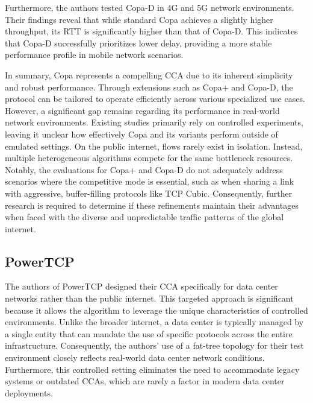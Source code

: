 \documentclass[conference]{IEEEtran}
\begin{document}
Furthermore, the authors tested Copa-D in 4G and 5G network environments. 
Their findings reveal that while standard Copa achieves a slightly higher throughput, its RTT is significantly higher than that of Copa-D. 
This indicates that Copa-D successfully prioritizes lower delay, providing a more stable performance profile in mobile network scenarios.

In summary, Copa represents a compelling \acs{CCA} due to its inherent simplicity and robust performance. 
Through extensions such as Copa+ and Copa-D, the protocol can be tailored to operate efficiently across various specialized use cases. 
However, a significant gap remains regarding its performance in real-world network environments. 
Existing studies primarily rely on controlled experiments, leaving it unclear how effectively Copa and its variants perform outside of emulated settings.
On the public internet, flows rarely exist in isolation.
Instead, multiple heterogeneous algorithms compete for the same bottleneck resources. 
Notably, the evaluations for Copa+ and Copa-D do not adequately address scenarios where the competitive mode is essential, such as when sharing a link with aggressive, buffer-filling protocols like TCP Cubic. 
Consequently, further research is required to determine if these refinements maintain their advantages when faced with the diverse and unpredictable traffic patterns of the global internet.

\subsection{PowerTCP}

The authors of PowerTCP designed their \acs{CCA} specifically for data center networks rather than the public internet. 
This targeted approach is significant because it allows the algorithm to leverage the unique characteristics of controlled environments. 
Unlike the broader internet, a data center is typically managed by a single entity that can mandate the use of specific protocols across the entire infrastructure. 
Consequently, the authors' use of a fat-tree topology for their test environment closely reflects real-world data center network conditions. 
Furthermore, this controlled setting eliminates the need to accommodate legacy systems or outdated \acs{CCA}s, which are rarely a factor in modern data center deployments.
\end{document}
